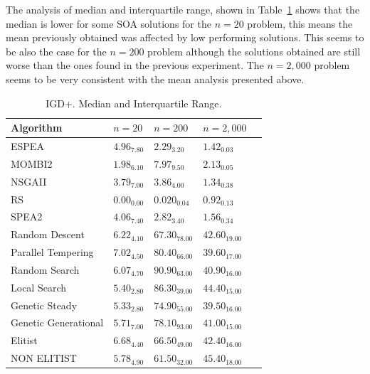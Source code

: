 The analysis of median and interquartile range, shown in Table~\ref{tab:me_int_che_igdp} shows that the median is lower for some SOA solutions for the $n=20$ problem, this means the mean previously obtained was affected by low performing solutions. This seems to be also the case for the $n=200$ problem although the solutions obtained are still worse than the ones found in the previous experiment. The $n=2,000$ problem seems to be very consistent with the mean analysis presented above.

\begin{table}[H]
    \centering
    {%
    \begin{tabular}{lllll}
    \hline
    Algorithm & $n=20$ & $n=200$ & $n=2,000$ \\
    \hline
    ESPEA                & $  4.96_{7.80}$                    & \cellcolor{gray25}$  2.29_{3.20}$    & $  1.42_{0.03}$                  \\
    MOMBI2               & \cellcolor{gray25}$  1.98_{6.10}$  & $  7.97_{ 9.50}$                     & $  2.13_{0.05}$                 \\
    NSGAII               & $  3.79_{7.00}$                    & $  3.86_{ 4.00}$                     & \cellcolor{gray25}$  1.34_{0.38}$\\
    RS                   & \cellcolor{gray95}$  0.00_{0.00}$  & \cellcolor{gray95}$  0.020_{ 0.04}$  & \cellcolor{gray95}$  0.92_{0.13}$\\
    SPEA2                & $  4.06_{7.40}$                   & $  2.82_{3.40}$                      & $  1.56_{0.34}$                  \\
    Random Descent       & $  6.22_{ 4.10}$ & $  67.30_{ 78.00}$ & $42.60_{ 19.00}$  \\
    Parallel Tempering   & $  7.02_{ 4.50}$ & $  80.40_{ 66.00}$ & $39.60_{ 17.00}$  \\
    Random Search        & $  6.07_{ 4.70}$ & $  90.90_{ 63.00}$ & $40.90_{ 16.00}$  \\
    Local Search         & $  5.40_{ 2.80}$ & $  86.30_{ 39.00}$ & $44.40_{ 15.00}$  \\
    Genetic Steady       & $  5.33_{ 2.80}$ & $  74.90_{ 55.00}$ & $39.50_{ 16.00}$  \\
    Genetic Generational & $  5.71_{ 7.00}$ & $  78.10_{ 93.00}$ & $41.00_{ 15.00}$  \\
    Elitist              & $  6.68_{ 4.40}$ & $  66.50_{ 49.00}$ & $42.40_{ 16.00}$  \\
    NON ELITIST          & $  5.78_{ 4.90}$ & $  61.50_{ 32.00}$ & $45.40_{ 18.00}$  \\
    \hline
    \end{tabular}%
    }
    \caption{IGD+. Median and Interquartile Range.}
    \label{tab:me_int_che_igdp}
\end{table}

